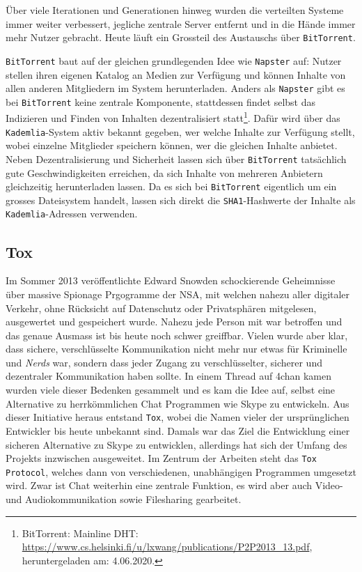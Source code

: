 \documentclass[a4paper,11pt,titlepage,twoside]{memoir}
\begin{document}
\noindent Über viele Iterationen und Generationen hinweg wurden
die verteilten Systeme immer weiter verbessert, jegliche zentrale
Server entfernt und in die Hände immer mehr Nutzer gebracht. Heute
läuft ein Grossteil des Austauschs über \texttt{BitTorrent}.

\noindent \texttt{BitTorrent} baut auf der gleichen grundlegenden Idee wie
\texttt{Napster} auf: Nutzer stellen ihren eigenen Katalog an Medien zur
Verfügung und können Inhalte von allen anderen Mitgliedern im
System herunterladen. Anders als \texttt{Napster} gibt es bei \texttt{BitTorrent}
keine zentrale Komponente, stattdessen findet selbst das
Indizieren und Finden von Inhalten dezentralisiert statt\footnote{BitTorrent: Mainline DHT:
\url{https://www.cs.helsinki.fi/u/lxwang/publications/P2P2013\_13.pdf},
heruntergeladen am: 4.06.2020.}.
Dafür wird über das \texttt{Kademlia}-System aktiv bekannt gegeben, wer
welche Inhalte zur Verfügung stellt, wobei einzelne Mitglieder
speichern können, wer die gleichen Inhalte anbietet. Neben
Dezentralisierung und Sicherheit lassen sich über \texttt{BitTorrent}
tatsächlich gute Geschwindigkeiten erreichen, da sich Inhalte von
mehreren Anbietern gleichzeitig herunterladen lassen. Da es sich
bei \texttt{BitTorrent} eigentlich um ein grosses Dateisystem handelt,
lassen sich direkt die \texttt{SHA1}-Hashwerte der Inhalte als
\texttt{Kademlia}-Adressen verwenden.
\subsection{Tox}
\label{sec:orgb4be60c}
Im Sommer 2013 veröffentlichte Edward Snowden schockierende
Geheimnisse über massive Spionage Prgogramme der NSA, mit welchen
nahezu aller digitaler Verkehr, ohne Rücksicht auf Datenschutz oder
Privatsphären mitgelesen, ausgewertet und gespeichert wurde. Nahezu
jede Person mit war betroffen und das genaue Ausmass ist bis heute
noch schwer greiffbar. Vielen wurde aber klar, dass sichere,
verschlüsselte Kommunikation nicht mehr nur etwas für Kriminelle und
\emph{Nerds} war, sondern dass jeder Zugang zu verschlüsselter, sicherer und
dezentraler Kommunikation haben sollte. In einem Thread auf 4chan
kamen wurden viele dieser Bedenken gesammelt und es kam die Idee auf,
selbst eine Alternative zu herrkömmlichen Chat Programmen wie Skype zu
entwickeln. Aus dieser Initiative heraus entstand \texttt{Tox}, wobei die Namen
vieler der ursprünglichen Entwickler bis heute unbekannt sind. Damals
war das Ziel die Entwicklung einer sicheren Alternative zu Skype zu
entwicklen, allerdings hat sich der Umfang des Projekts inzwischen
ausgeweitet. Im Zentrum der Arbeiten steht das \texttt{Tox Protocol}, welches
dann von verschiedenen, unabhängigen Programmen umgesetzt wird. Zwar
ist Chat weiterhin eine zentrale Funktion, es wird aber auch Video-
und Audiokommunikation sowie Filesharing gearbeitet.\\
\end{document}
